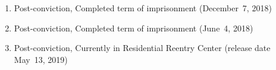 \begin{enumerate}[1.]

    \item {}

Post-conviction, Completed term of imprisonment (December~7, 2018)

    \item {}

Post-conviction, Completed term of imprisonment (June~4, 2018)

    \item {}

Post-conviction, Currently in Residential Reentry Center (release date May~13, 2019)

\end{enumerate}

\cleardoublepage
